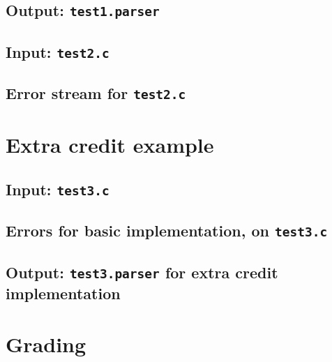 \documentclass{article}
\begin{document}
\subsection{Output: {\tt test1.parser}}



\subsection{Input: {\tt test2.c}}



\subsection{Error stream for {\tt test2.c}}



\section{Extra credit example} \label{SEC:outextra}

\subsection{Input: {\tt test3.c}}



\subsection{Errors for basic implementation, on {\tt test3.c}}



\subsection{Output: {\tt test3.parser} for extra credit implementation}



\section{Grading}
\end{document}
